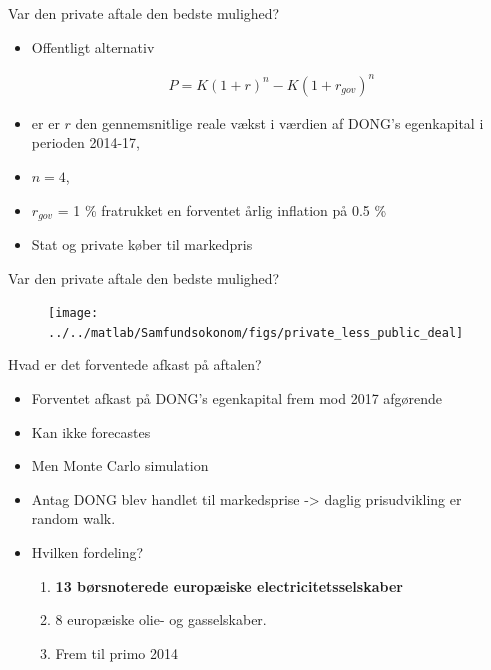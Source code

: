 \documentclass{beamer}
\begin{document}
\begin{frame}{Var den private  aftale den bedste mulighed?}
	\begin{itemize}
		\item Offentligt alternativ
		
		\begin{align}
		P=K(1+r)^n-K(1+r_{gov})^n
		\label{eq:gov_capital}
		\end{align}
		
		\item er er $r$ den gennemsnitlige reale vækst i værdien af DONG's egenkapital i perioden 2014-17, 
		\item $n=4$, 
		\item $r_{gov}$ = 1 \% fratrukket en forventet årlig inflation på 0.5 \%
		\item Stat og private køber til markedpris 
	\end{itemize}

\end{frame}

\begin{frame}{Var den private  aftale den bedste mulighed?}
\begin{figure}
\centering
\texttt{[image: ../../matlab/Samfundsokonom/figs/private\_less\_public\_deal]}
\label{fig:comp}
\end{figure}	
\end{frame}

\begin{frame}{Hvad er det forventede afkast på aftalen?}
\begin{itemize}
	\item Forventet afkast på DONG's egenkapital frem mod 2017 afgørende
	\item Kan ikke forecastes
	\item Men Monte Carlo simulation
	\item Antag DONG blev handlet til markedsprise -> daglig prisudvikling er random walk.
	\item Hvilken fordeling?
	\begin{enumerate}
		\item \textbf{13 børsnoterede europæiske electricitetsselskaber}
		\item 8 europæiske olie- og gasselskaber. 
		\item Frem til primo 2014
	\end{enumerate}
\end{itemize}
\end{frame}
\end{document}
